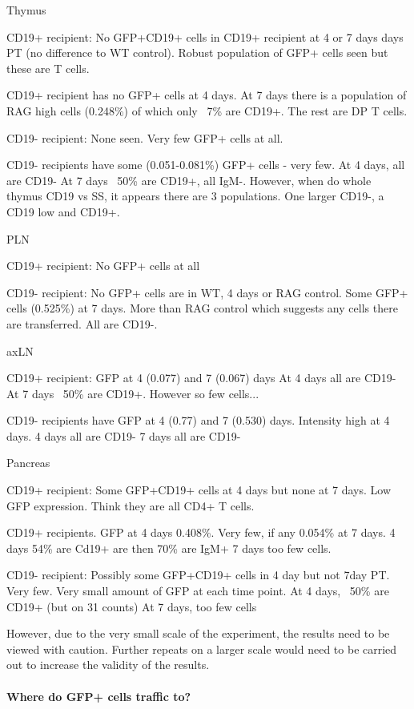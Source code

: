 Thymus 

CD19+ recipient: No GFP+CD19+ cells in CD19+ recipient at 4 or 7 days days PT (no difference to WT control).
Robust population of GFP+ cells seen but these are T cells.

CD19+ recipient has no GFP+ cells at 4 days.
At 7 days there is a population of RAG high cells (0.248\%) of which only ~7\% are CD19+. 
The rest are DP T cells.

CD19- recipient: None seen. Very few GFP+ cells at all.

CD19- recipients have some (0.051-0.081\%) GFP+ cells - very few.
At 4 days, all are CD19-
At 7 days ~50\% are CD19+, all IgM-.
However, when do whole thymus CD19 vs SS, it appears there are 3 populations. One larger CD19-, a CD19 low and CD19+.


PLN

CD19+ recipient: No GFP+ cells at all

CD19- recipient: No GFP+ cells are in WT, 4 days or RAG control. 
Some GFP+ cells (0.525\%) at 7 days. More than RAG control which suggests any cells there are transferred. All are CD19-.

axLN

CD19+ recipient: GFP at 4 (0.077) and 7 (0.067) days
At 4 days all are CD19-
At 7 days ~50\% are CD19+. However so few cells...

CD19- recipients have GFP at 4 (0.77) and 7 (0.530) days. 
Intensity high at 4 days.
4 days all are CD19-
7 days all are CD19-

Pancreas

CD19+ recipient: Some GFP+CD19+ cells at 4 days but none at 7 days. 
Low GFP expression.
Think they are all CD4+ T cells.

CD19+ recipients. GFP at 4 days 0.408\%. Very few, if any 0.054\% at 7 days.
4 days 54\% are Cd19+ are then 70\% are IgM+
7 days too few cells.

CD19- recipient: Possibly some GFP+CD19+ cells in 4 day but not 7day PT. Very few.
Very small amount of GFP at each time point.
At 4 days, ~50\% are CD19+ (but on 31 counts)
At 7 days, too few cells


However, due to the very small scale of the experiment, the results need to be viewed with caution.
Further repeats on a larger scale would need to be carried out to increase the validity of the results.
\paragraph{Where do GFP+ cells traffic to?}
